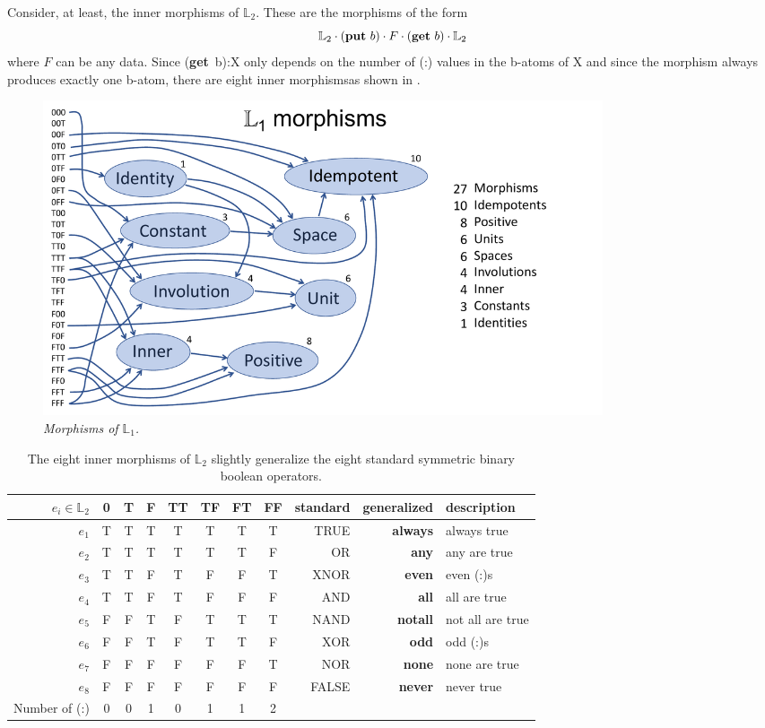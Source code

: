 \documentclass[11pt]{article}
\begin{document}
    Consider, at least, the inner morphisms of ${\mathbb L}_2$.  These are the morphisms of the form
 \begin{equation}
 {\mathbb L}_2\cdot ({\bf put}\ b)\cdot F \cdot ({\bf get}\ b) \cdot {\mathbb L}_2 
 \end{equation}
 where $F$ can be any data.  Since ({\bf get}\ b):X only depends on the number of (:) values in the b-atoms of X and since the morphism always produces exactly one b-atom, 
 there are eight inner morphismsas shown in \cite{L2}.

\begin{figure}[h]
\centering
\includegraphics[width=0.8\textwidth]{L1.pdf}
\caption{{\it Morphisms of ${\mathbb L}_1$.}}
\end{figure}

\begin{table}
\caption{The eight inner morphisms of ${\mathbb L}_2$ slightly generalize the eight standard symmetric binary boolean operators.}
\centering 
\begin{tabular}{r c c c c c c c r r l}
\hline\hline
$e_i \in {\mathbb L}_2$ & 0 & T & F & TT & TF & FT & FF & standard & generalized & description \\ [0.5ex] 
\hline
$e_1$  & T & T & T & T & T & T & T & TRUE & {\bf always} & always true \\
$e_2$  & T & T & T & T & T & T & F & OR & {\bf any} & any are true \\
$e_3$  & T & T & F & T & F & F & T & XNOR & {\bf even} & even (:)s \\
$e_4$ & T & T & F & T & F & F & F & AND & {\bf all} & all are true \\
$e_5$ & F & F & T & F & T & T & T & NAND & {\bf notall} & not all are true \\
$e_6$ & F & F & T & F & T & T & F & XOR & {\bf odd} & odd (:)s \\
$e_7$ & F & F & F & F & F & F & T & NOR & {\bf none} & none are true  \\
$e_8$ & F & F & F & F & F & F & F & FALSE & {\bf never} & never true \\
\hline
Number of (:)   & 0 & 0 & 1 & 0 & 1 & 1 & 2 &  \\ 
\hline
\end{tabular}
\label{table:L2}
\end{table} 
\end{document}
